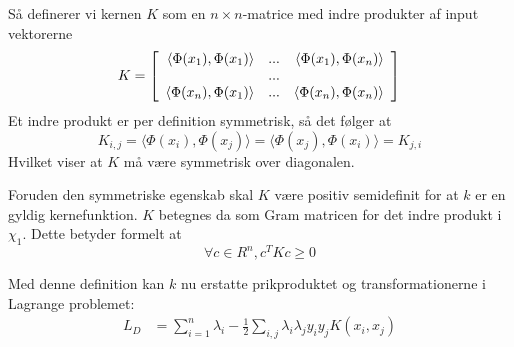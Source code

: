 \documentclass{article}
\begin{document}
Så definerer vi kernen $K$ som en $n\times n$-matrice med indre produkter af input vektorerne
\begin{equation}
K=\left[\begin{array}{r r r}
\langle\Phi(x_1),\Phi(x_1)\rangle & ... & \langle\Phi(x_1),\Phi(x_n)\rangle\\
 & ... & \\
\langle\Phi(x_n),\Phi(x_1)\rangle & ... & \langle\Phi(x_n),\Phi(x_n)\rangle\\
\end{array}\right]\\
\end{equation}
Et indre produkt er per definition symmetrisk, så det følger at
\begin{equation}
K_{i,j}=\langle\Phi(x_i),\Phi(x_j)\rangle=\langle\Phi(x_j),\Phi(x_i)\rangle=K_{j,i}
\end{equation}
Hvilket viser at $K$ må være symmetrisk over diagonalen. 

Foruden den symmetriske egenskab skal $K$ være positiv semidefinit for at $k$ er en gyldig kernefunktion. $K$ betegnes da som Gram matricen for det indre produkt i $\chi_1$. Dette betyder formelt at
\begin{equation}
\forall c\in R^n,c^TKc\geq 0
\end{equation}




Med denne definition kan $k$ nu erstatte prikproduktet og transformationerne i Lagrange problemet:
\begin{align*}
L_D&=\sum_{i=1}^{n}\lambda_i-\frac{1}{2}\sum_{i,j}\lambda_i\lambda_j y_iy_jK(x_i,x_j)
\end{align*}
\end{document}
